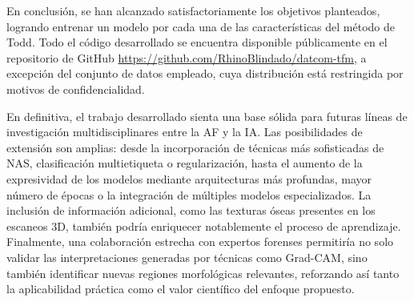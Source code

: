 En conclusión, se han alcanzado satisfactoriamente los objetivos planteados, logrando entrenar un modelo por cada una de las características del método de Todd. Todo el código desarrollado se encuentra disponible públicamente en el repositorio de GitHub \url{https://github.com/RhinoBlindado/datcom-tfm}, a excepción del conjunto de datos empleado, cuya distribución está restringida por motivos de confidencialidad.

En definitiva, el trabajo desarrollado sienta una base sólida para futuras líneas de investigación multidisciplinares entre la AF y la IA. Las posibilidades de extensión son amplias: desde la incorporación de técnicas más sofisticadas de NAS, clasificación multietiqueta o regularización, hasta el aumento de la expresividad de los modelos mediante arquitecturas más profundas, mayor número de épocas o la integración de múltiples modelos especializados. La inclusión de información adicional, como las texturas óseas presentes en los escaneos 3D, también podría enriquecer notablemente el proceso de aprendizaje. Finalmente, una colaboración estrecha con expertos forenses permitiría no solo validar las interpretaciones generadas por técnicas como Grad-CAM, sino también identificar nuevas regiones morfológicas relevantes, reforzando así tanto la aplicabilidad práctica como el valor científico del enfoque propuesto.